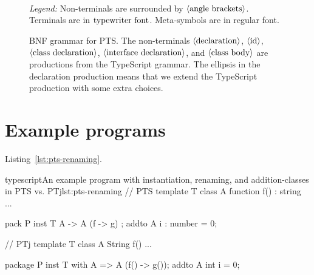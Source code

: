 \begin{figure}
\begin{bnf*}
        {  \bnfsp \bnfts{->} \bnfsp {} }\\
        {  \bnfsp {} \bnfsp {} \bnfsp {} }\\
        {  \bnfor \bnfes }\\
    \end{bnf*}
    \caption{BNF grammar for PTS. The non-terminals $\langle \textrm{declaration} \rangle$, $\langle \textrm{id} \rangle$, $\langle \textrm{class declaration} \rangle$, $\langle \textrm{interface declaration} \rangle$, and $\langle \textrm{class body} \rangle$ are productions from the TypeScript grammar.
    The ellipsis in the declaration production means that we extend the TypeScript production with some extra choices.}

    \textit{Legend:} Non-terminals are surrounded by $\langle \textrm{angle brackets} \rangle$.
    Terminals are in $\textrm{typewriter font}$.
    Meta-symbols are in regular font.
    \label{fig:pts-grammar}
\end{figure}

\section{Example programs}\label{sec:example-programs}

Listing~\vref{lst:pts-renaming}.

\begin{code}{typescript}{An example program with instantiation, renaming, and addition-classes in PTS vs. PTj}{lst:pts-renaming}
    // PTS
    template T {
        class A {
            function f() : string {
                ...
            }
        }
    }

    pack P {
        inst T { A -> A (f -> g) };
        addto A {
            i : number = 0;
        }
    }

    // PTj
    template T {
        class A {
            String f() {
                ...
            }
        }
    }

    package P {
        inst T with A => A (f() -> g());
        addto A {
            int i = 0;
        }
    }
\end{code}
